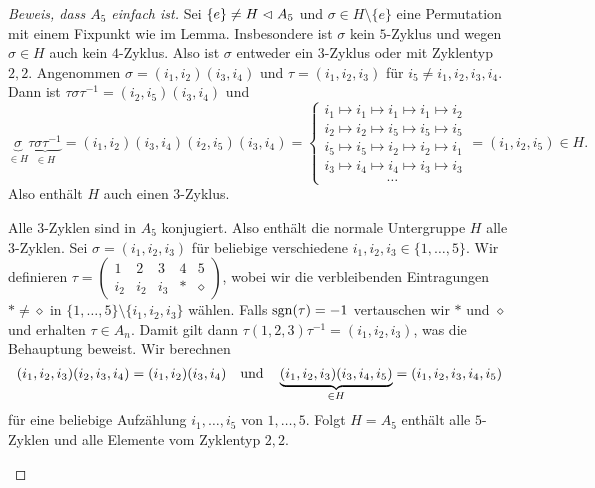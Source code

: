 \begin{proof}[Beweis, dass $A_5$ einfach ist]
	Sei $\{e\} \neq H \vartriangleleft A_5$ und $\sigma \in H \setminus \{e\} $ eine Permutation mit einem Fixpunkt wie im Lemma.
	Insbesondere ist $\sigma$ kein $5$-Zyklus und wegen $\sigma \in H$ auch kein $4$-Zyklus.
	Also ist $\sigma$ entweder ein $3$-Zyklus oder mit Zyklentyp $2,2$.
	Angenommen $\sigma = (i_1, i_2) (i_3,i_4)$ und $\tau = (i_1,i_2,i_3)$ für $i_5 \neq i_1,i_2,i_3,i_4$.
	Dann ist $\tau \sigma \tau^{-1} = (i_2,i_5)(i_3,i_4)$ und 
	\[
		\underbrace{\sigma}_{\in H} \underbrace{\tau \sigma \tau^{-1}}_{\in H} = (i_1,i_2)(i_3,i_4)(i_2,i_5)(i_3,i_4) = \begin{cases}
			i_1 \mapsto i_1 \mapsto i_1 \mapsto i_1 \mapsto i_2\\
			i_2 \mapsto i_2 \mapsto i_5 \mapsto i_5 \mapsto  i_5\\
			i_5 \mapsto i_5 \mapsto  i_2 \mapsto i_2\mapsto i_1\\
			i_3 \mapsto i_4 \mapsto i_4 \mapsto i_3 \mapsto i_3\\
			\qquad \qquad\;\,\ldots
		\end{cases} = (i_1,i_2,i_5) \in H
	.\]
	Also enthält $H$ auch einen $3$-Zyklus.

	\begin{claim}
		Alle $3$-Zyklen sind in $A_5$ konjugiert. Also enthält die normale Untergruppe $H$ alle $3$-Zyklen.
		Sei $\sigma = (i_1,i_2,i_3)$ für beliebige verschiedene $i_1,i_2,i_3 \in \{1,\ldots,5\}$.
		Wir definieren $\tau = \begin{pmatrix} 
			1 &2 &3 &4 &5\\
			i_2 &i_2 &i_3 &* &\diamond 
		\end{pmatrix} $,
		wobei wir die verbleibenden Eintragungen $* \neq \diamond $ in $\{1,\ldots,5\} \setminus \{i_1,i_2,i_3\} $ wählen.
		Falls $\operatorname{sgn}(\tau) = -1$ vertauschen wir $*$ und $\diamond $ und erhalten $\tau \in A_{n}$.
		Damit gilt dann $\tau (1,2,3) \tau^{-1} = (i_1,i_2,i_3)$, was die Behauptung beweist.
		Wir berechnen
		 \[
			 (i_1,i_2,i_3)(i_2,i_3,i_4) = (i_1,i_2)(i_3,i_4) \qq{und} \underbrace{(i_1,i_2,i_3)(i_3,i_4,i_5)}_{\in H} = (i_1,i_2,i_3,i_4,i_5)
		\] 
		für eine beliebige Aufzählung $i_1,\ldots,i_5$ von $1,\ldots,5$.
		Folgt $H = A_5$ enthält alle $5$-Zyklen und alle Elemente vom Zyklentyp $2,2$.
	\end{claim}
\end{proof}

